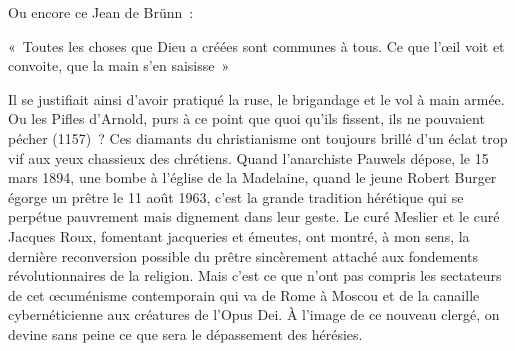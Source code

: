 \documentclass[french,twoside]{book} %
\newcommand{\astermono}{\medskip\centerline{\color{rubric}\large\selectfont{\syms ✻}}\medskip\par}%
\begin{document}
\noindent Ou encore ce Jean de Brünn :\par
« Toutes les choses que Dieu a créées sont communes à tous. Ce que l’œil voit et convoite, que la main s’en saisisse »\par
Il se justifiait ainsi d’avoir pratiqué la ruse, le brigandage et le vol à main armée. Ou les Pifles d’Arnold, purs à ce point que quoi qu’ils fissent, ils ne pouvaient pécher (1157) ? Ces diamants du christianisme ont toujours brillé d’un éclat trop vif aux yeux chassieux des chrétiens. Quand l’anarchiste Pauwels dépose, le 15 mars 1894, une bombe à l’église de la Madelaine, quand le jeune Robert Burger égorge un prêtre le 11 août 1963, c’est la grande tradition hérétique qui se perpétue pauvrement mais dignement dans leur geste. Le curé Meslier et le curé Jacques Roux, fomentant jacqueries et émeutes, ont montré, à mon sens, la dernière reconversion possible du prêtre sincèrement attaché aux fondements révolutionnaires de la religion. Mais c’est ce que n’ont pas compris les sectateurs de cet œcuménisme contemporain qui va de Rome à Moscou et de la canaille cybernéticienne aux créatures de l’Opus Dei. À l’image de ce nouveau clergé, on devine sans peine ce que sera le dépassement des hérésies.\par

\astermono
\end{document}
